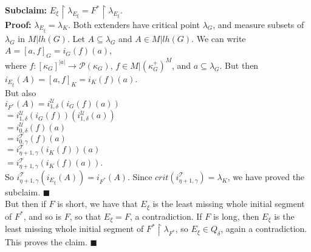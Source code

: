 \documentclass[12pt]{article}
\begin{document}
\textbf{Subclaim:} $E_\xi \restriction \lambda_{E_\xi} = F^* \restriction \lambda_{E_\xi}$.\\

\indent \indent \textbf{Proof:} $\lambda_{E_\xi} = \lambda_K$.  Both extenders have critical point $\lambda_G$, and measure subsets of $\lambda_G$ in $M | lh(G)$.  Let $A \subseteq \lambda_G$ and $A \in M | lh(G)$.  We can write\\

\indent $A = [a , f]_G = i_G (f) (a)$,\\

where $f: [\kappa_G ]^{|a|} \longrightarrow \mathcal{P} (\kappa_G )$, $f \in M | (\kappa_G^+ )^M$, and $a \subseteq \lambda_G$.  But then\\

\indent $i_{E_\xi} (A) = [ a, f ]_K = i_K (f) (a)$.\\

But also\\

\indent $i_{F^*} (A) = i_{1, \delta}^{\mathscr{U}} ( i_G (f)(a))$\\

\indent \indent \indent $= i_{1, \delta}^{\mathscr{U}} ( i_G (f)) (i_{1, \delta}^{\mathscr{U}} ( a))$\\

\indent \indent \indent $= i_{0, \delta}^{\mathscr{U}} ( f)(a)$\\

\indent \indent \indent $= i_{0, \gamma}^{\mathscr{T}} ( f)(a)$\\

\indent \indent \indent $= i_{\eta + 1, \gamma}^{\mathscr{T}} ( i_K(f))(a)$\\

\indent \indent \indent $= i_{\eta + 1, \gamma}^{\mathscr{T}} ( i_K(f)(a))$.\\

So $ i_{\eta + 1, \gamma}^{\mathscr{T}} (i_{E_\xi} (A)) = i_{F^*} (A)$.  Since $crit (i_{\eta + 1 , \gamma }^{\mathscr{T}} ) = \lambda_K$, we have proved the subclaim. $\blacksquare$\\

But then if $F$ is short, we have that $E_\xi$ is the least missing whole initial segment of $F^*$, and so is $F$, so that $E_\xi = F$, a contradiction.  If $F$ is long, then $E_\xi$ is the least missing whole initial segment of $F^* \restriction \lambda_{F^*}$, so $E_\xi \in Q_\delta$, again a contradiction.  This proves the claim. $\blacksquare$\\
\end{document}
